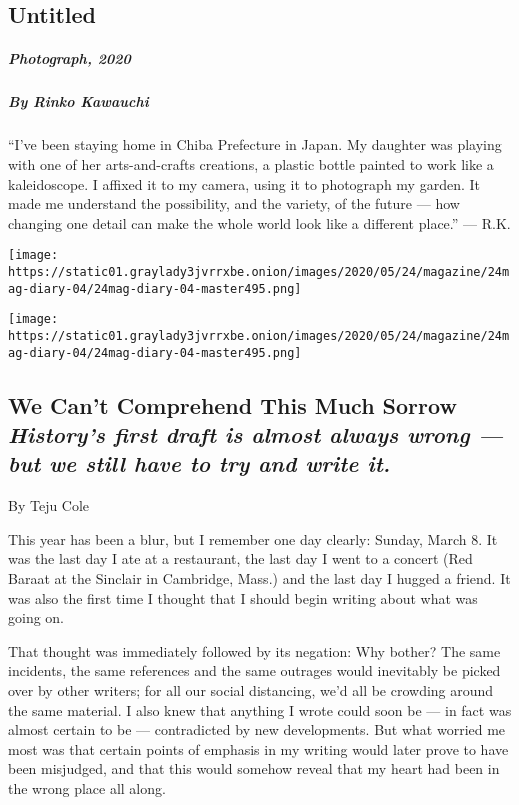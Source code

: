 \hypertarget{untitled-1}{%
\subsection{Untitled}\label{untitled-1}}

\hypertarget{photograph-2020-3}{%
\subparagraph{Photograph, 2020}\label{photograph-2020-3}}

\hypertarget{by-rinko-kawauchi-1}{%
\subparagraph{By Rinko Kawauchi}\label{by-rinko-kawauchi-1}}

``I've been staying home in Chiba Prefecture in Japan. My daughter was
playing with one of her arts-and-crafts creations, a plastic bottle
painted to work like a kaleidoscope. I affixed it to my camera, using it
to photograph my garden. It made me understand the possibility, and the
variety, of the future --- how changing one detail can make the whole
world look like a different place.'' --- R.K.

\texttt{[image: https://static01.graylady3jvrrxbe.onion/images/2020/05/24/magazine/24mag-diary-04/24mag-diary-04-master495.png]}

\texttt{[image: https://static01.graylady3jvrrxbe.onion/images/2020/05/24/magazine/24mag-diary-04/24mag-diary-04-master495.png]}

\hypertarget{we-cant-comprehend-this-much-sorrow-historys-first-draft-is-almost-always-wrong--but-we-still-have-to-try-and-write-it}{%
\subsection{\texorpdfstring{We Can't Comprehend This Much Sorrow
\emph{History's first draft is almost always wrong --- but we still have
to try and write
it.}}{We Can't Comprehend This Much Sorrow History's first draft is almost always wrong --- but we still have to try and write it.}}\label{we-cant-comprehend-this-much-sorrow-historys-first-draft-is-almost-always-wrong--but-we-still-have-to-try-and-write-it}}

By Teju Cole

This year has been a blur, but I remember one day clearly: Sunday, March
8. It was the last day I ate at a restaurant, the last day I went to a
concert (Red Baraat at the Sinclair in Cambridge, Mass.) and the last
day I hugged a friend. It was also the first time I thought that I
should begin writing about what was going on.

That thought was immediately followed by its negation: Why bother? The
same incidents, the same references and the same outrages would
inevitably be picked over by other writers; for all our social
distancing, we'd all be crowding around the same material. I also knew
that anything I wrote could soon be --- in fact was almost certain to be
--- contradicted by new developments. But what worried me most was that
certain points of emphasis in my writing would later prove to have been
misjudged, and that this would somehow reveal that my heart had been in
the wrong place all along.

